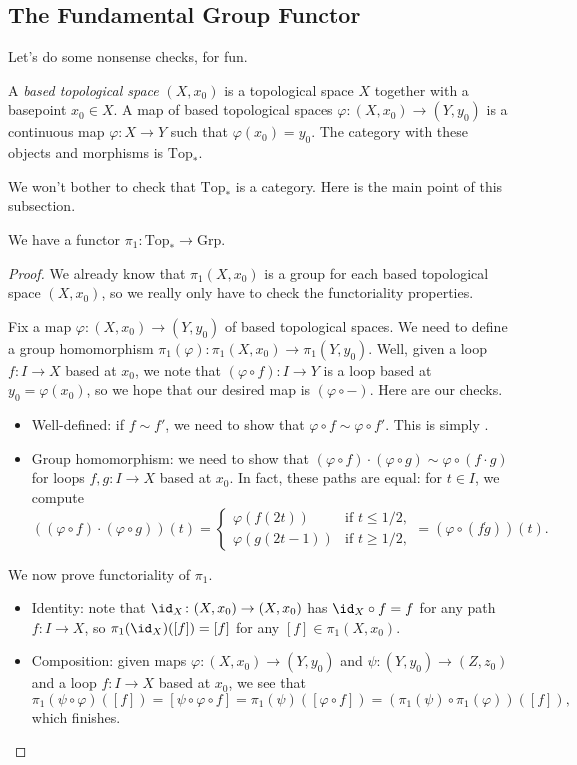 \documentclass[../notes.tex]{subfiles}
\begin{document}
\subsection{The Fundamental Group Functor}
Let's do some nonsense checks, for fun.
\begin{definition}
	A \textit{based topological space} $(X,x_0)$ is a topological space $X$ together with a basepoint $x_0\in X$. A map of based topological spaces $\varphi\colon(X,x_0)\to(Y,y_0)$ is a continuous map $\varphi\colon X\to Y$ such that $\varphi(x_0)=y_0$. The category with these objects and morphisms is $\mathrm{Top}_*$.
\end{definition}
We won't bother to check that $\mathrm{Top}_*$ is a category. Here is the main point of this subsection.
\begin{proposition} \label{prop:pi-1-functor}
	We have a functor $\pi_1\colon\mathrm{Top}_*\to\mathrm{Grp}$.
\end{proposition}
\begin{proof}
	We already know that $\pi_1(X,x_0)$ is a group for each based topological space $(X,x_0)$, so we really only have to check the functoriality properties.

	Fix a map $\varphi\colon(X,x_0)\to(Y,y_0)$ of based topological spaces. We need to define a group homomorphism $\pi_1(\varphi)\colon\pi_1(X,x_0)\to\pi_1(Y,y_0)$. Well, given a loop $f\colon I\to X$ based at $x_0$, we note that $(\varphi\circ f)\colon I\to Y$ is a loop based at $y_0=\varphi(x_0)$, so we hope that our desired map is $(\varphi\circ-)$. Here are our checks.
	\begin{itemize}
		\item Well-defined: if $f\sim f'$, we need to show that $\varphi\circ f\sim\varphi\circ f'$. This is simply .
		\item Group homomorphism: we need to show that $(\varphi\circ f)\cdot(\varphi\circ g)\sim\varphi\circ(f\cdot g)$ for loops $f,g\colon I\to X$ based at $x_0$. In fact, these paths are equal: for $t\in I$, we compute
		\[((\varphi\circ f)\cdot(\varphi\circ g))(t)=\begin{cases}
			\varphi(f(2t)) & \text{if }t\le1/2, \\
			\varphi(g(2t-1)) & \text{if }t\ge1/2,
		\end{cases}=(\varphi\circ(f\dot g))(t).\]
	\end{itemize}
	We now prove functoriality of $\pi_1$.
	\begin{itemize}
		\item Identity: note that $\id_X\colon(X,x_0)\to(X,x_0)$ has ${\id_X}\circ f=f$ for any path $f\colon I\to X$, so $\pi_1({\id_X})([f])=[f]$ for any $[f]\in\pi_1(X,x_0)$.
		\item Composition: given maps $\varphi\colon(X,x_0)\to(Y,y_0)$ and $\psi\colon(Y,y_0)\to(Z,z_0)$ and a loop $f\colon I\to X$ based at $x_0$, we see that
		\[\pi_1(\psi\circ\varphi)([f])=[\psi\circ\varphi\circ f]=\pi_1(\psi)([\varphi\circ f])=(\pi_1(\psi)\circ\pi_1(\varphi))([f]),\]
		which finishes.
		\qedhere
	\end{itemize}
\end{proof}
\end{document}
